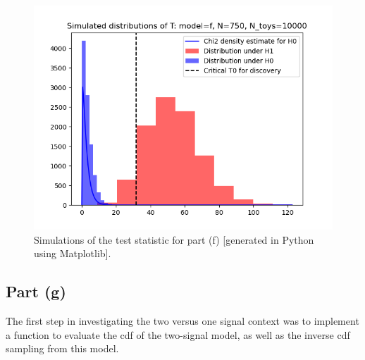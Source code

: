 \documentclass[12pt]{article}
\begin{document}
\begin{figure}[hbt]
  \includegraphics[scale=0.8]{T_distributions_f_750_10000.png}
  \caption{Simulations of the test statistic for part (f) [generated in Python using Matplotlib].}
  \label{part_f_plot}
\end{figure}

\subsection*{Part (g)}

The first step in investigating the two versus one signal context was to implement a function to evaluate the cdf of the two-signal model, as well as the inverse cdf sampling from this model.
\end{document}
